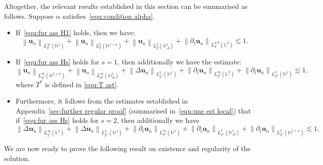 \documentclass[11pt,reqno]{amsart}
\theoremstyle{definition}
\numberwithin{equation}{section}
\newcommand{\bff}{\boldsymbol}
\newcommand{\bb}{\mathbb}
\newcommand{\leqs}{\lesssim}
\newcommand{\pa}{\partial}
\newcommand{\norm}[2]{\left\|{#1}\right\|_{#2}}
\begin{document}
Altogether, the relevant results established in this section can be summarised as follows. Suppose $\alpha$ satisfies~\eqref{equ:condition alpha}.
	\begin{itemize}
		\item If~\eqref{equ:fur ass H1} holds, then we have:
		\begin{equation}\label{equ:un H1 summ}
				\norm{\bff{u}_n}{L^\infty_T(\bb{H}^1)}
				+
				\norm{\bff{u}_n}{L^2_T(\bb{H}^{1+\alpha})}
				+
				\norm{\bff{u}_n}{L^2_T(\bb{H}^1_\Delta)}
				+
				\norm{\pa_t \bff{u}_n}{L^{4/3}_T(\bb{L}^2)}
				\lesssim 1.
		\end{equation}
		\item If~\eqref{equ:fur ass Hs} holds for $s=1$, then additionally we have the estimate:
		\begin{equation}\label{equ:un H2 summary}
			\norm{\bff{u}_n}{L^\infty_{T^\ast}(\bb{H}^{1+\alpha})}
			+
			\norm{\bff{u}_n}{L^\infty_{T^\ast}(\bb{H}^1_\Delta)}
			+
			\norm{\Delta \bff{u}_n}{L^2_{T^\ast}(\bb{H}^1)}
			+
			\norm{\pa_t\bff{u}_n}{L^\infty_{T^\ast}(\bb{L}^2)}
			+
			\norm{\pa_t\bff{u}_n}{L^2_{T^\ast}(\bb{H}^1)}
			\lesssim 1,
		\end{equation}
		where $T^\ast$ is defined in \eqref{equ:T ast}.
		\item Furthermore, it follows from the estimates established in Appendix~\ref{sec:further regular proof} (summarised in~\eqref{equ:une est local}) that if~\eqref{equ:fur ass Hs} holds for $s=2$, then additionally we have
		\begin{equation}\label{equ:un H3 summary}
			\norm{\Delta \bff{u}_n}{L^\infty_{T^\ast}(\bb{L}^2)}
			+
			\norm{\Delta \bff{u}_n}{L^2_{T^\ast}(\bb{H}^1)}
			+
			\norm{\pa_t\bff{u}_n}{L^\infty_{T^\ast}(\bb{H}^1)}
			+
			\norm{\pa_t\bff{u}_n}{L^2_{T^\ast}(\bb{H}^1_\Delta)}
			+
			\norm{\pa_t\bff{u}_n}{L^2_{T^\ast}(\bb{H}^{1+\alpha})}
			\leqs 1.
		\end{equation}
	\end{itemize}
	

We are now ready to prove the following result on existence and regularity of the solution.



\end{document}
